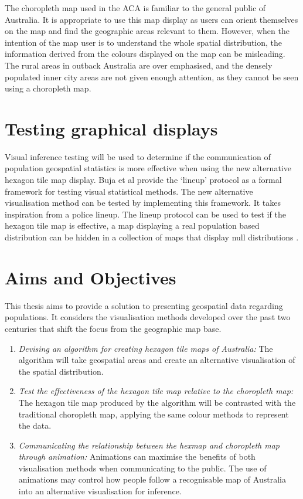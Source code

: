 \documentclass{monashthesis}
\begin{document}
The choropleth map used in the ACA is familiar to the general public of Australia. It is appropriate to use this map display as users can orient themselves on the map and find the geographic areas relevant to them.
However, when the intention of the map user is to understand the whole spatial distribution, the information derived from the colours displayed on the map can be misleading.
The rural areas in outback Australia are over emphasised, and the densely populated inner city areas are not given enough attention, as they cannot be seen using a choropleth map.

\hypertarget{testing-graphical-displays}{%
\section{Testing graphical displays}\label{testing-graphical-displays}}

Visual inference testing will be used to determine if the communication of population geospatial statistics is more effective when using the new alternative hexagon tile map display.
Buja et al \autocite{GIIV} provide the `lineup' protocol as a formal framework for testing visual statistical methods. The new alternative visualisation method can be tested by implementing this framework.
It takes inspiration from a police lineup.
The lineup protocol can be used to test if the hexagon tile map is effective, a map displaying a real population based distribution can be hidden in a collection of maps that display null distributions \autocite{chowd}.

\hypertarget{sec:aims}{%
\section{Aims and Objectives}\label{sec:aims}}

This thesis aims to provide a solution to presenting geospatial data regarding populations.
It considers the visualisation methods developed over the past two centuries that shift the focus from the geographic map base.

\begin{enumerate}
\def\labelenumi{\arabic{enumi}.}
\item
  \emph{Devising an algorithm for creating hexagon tile maps of Australia:} The algorithm will take geospatial areas and create an alternative visualisation of the spatial distribution.
\item
  \emph{Test the effectiveness of the hexagon tile map relative to the choropleth map:} The hexagon tile map produced by the algorithm will be contrasted with the traditional choropleth map, applying the same colour methods to represent the data.
\item
  \emph{Communicating the relationship between the hexmap and choropleth map through animation:} Animations can maximise the benefits of both visualisation methods when communicating to the public. The use of animations may control how people follow a recognisable map of Australia into an alternative visualisation for inference.
\end{enumerate}
\end{document}
